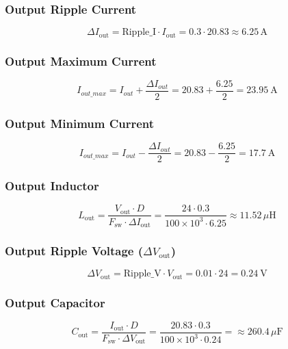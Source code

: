 \subsubsection*{Output Ripple Current}
\begin{equation}
    \Delta I_{\text{out}} = \text{Ripple\_I} \cdot I_{\text{out}} = 0.3 \cdot 20.83 \approx \boxed{6.25\,\text{A}}
\end{equation}

\subsubsection*{Output Maximum Current}
\begin{equation}
I_{out\_max} = I_{out} + \frac{\Delta I_{out}}{2} = 20.83 + \frac{6.25}{2} = \boxed{\SI{23.95}{\ampere}}    
\end{equation}

\subsubsection*{Output Minimum Current}
\begin{equation}
I_{out\_max} = I_{out} - \frac{\Delta I_{out}}{2} = 20.83 - \frac{6.25}{2} = \boxed{\SI{17.7}{\ampere}}    
\end{equation}

\subsubsection*{Output Inductor}
\begin{equation}
     L_{\text{out}} = \frac{V_{\text{out}} \cdot D}{F_{\text{sw}} \cdot \Delta I_{\text{out}}} = \frac{24 \cdot 0.3}{100 \times 10^3 \cdot 6.25} \approx \boxed{11.52\,\mu\text{H}}
\end{equation}

\subsubsection*{Output Ripple Voltage (\(\Delta V_{\text{out}}\))}
\begin{equation}
\Delta V_{\text{out}} = \text{Ripple\_V} \cdot V_{\text{out}} = 0.01 \cdot 24 = \boxed{\SI{0.24}{\volt}}
\end{equation}

\subsubsection*{Output Capacitor}
\begin{equation}
    C_{\text{out}} = \frac{I_{\text{out}} \cdot D}{F_{\text{sw}} \cdot \Delta V_{\text{out}}} = \frac{20.83 \cdot 0.3}{100 \times 10^3 \cdot 0.24} = \approx \boxed{260.4\,\mu\text{F}}
\end{equation}

